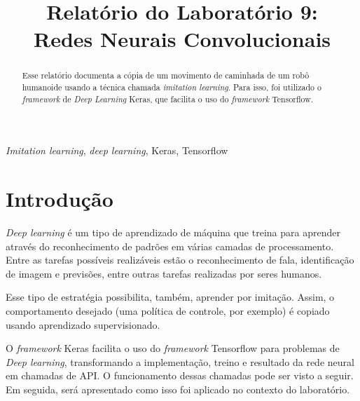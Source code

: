 \documentclass[conference]{IEEEtran}
\begin{document}
\title{Relatório do Laboratório 9: \\ Redes Neurais Convolucionais\\
}

\author{
}

\maketitle

\begin{abstract}
Esse relatório documenta a cópia de um movimento de caminhada de um robô humanoide usando a técnica chamada \textit{imitation learning}. Para isso, foi utilizado o \textit{framework} de \textit{Deep Learning} Keras, que facilita o uso do \textit{framework} Tensorflow.
\end{abstract}

\begin{IEEEkeywords}
\textit{Imitation learning}, \textit{deep learning}, Keras, Tensorflow
\end{IEEEkeywords}

\section{Introdução}
\textit{Deep learning} é um tipo de aprendizado de máquina que treina para aprender através do reconhecimento de padrões em várias camadas de processamento. Entre as tarefas possíveis realizáveis estão o reconhecimento de fala, identificação de imagem e previsões, entre outras tarefas realizadas por seres humanos. 

Esse tipo de estratégia possibilita, também, aprender por imitação. Assim, o comportamento desejado (uma política de controle, por exemplo) é copiado usando aprendizado supervisionado.

O \textit{framework} Keras facilita o uso do \textit{framework} Tensorflow para problemas de \textit{Deep learning}, transformando a implementação, treino e resultado da rede neural em chamadas de API. O funcionamento dessas chamadas pode ser visto a seguir. Em seguida, será apresentado como isso foi aplicado no contexto do laboratório.
\end{document}
